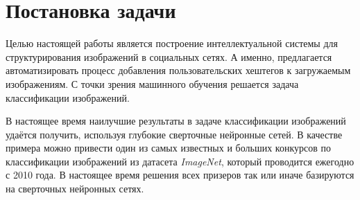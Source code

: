 \section{Постановка задачи}


\indent 
\indent
Целью настоящей работы является построение интеллектуальной системы для
структурирования изображений в социальных сетях. А именно, предлагается
автоматизировать процесс добавления пользовательских хештегов к загружаемым
изображениям. С точки зрения машинного обучения решается задача классификации изображений.

\indent
В настоящее время наилучшие результаты в задаче классификации изображений 
удаётся получить, используя глубокие сверточные нейронные сетей. В 
качестве примера можно привести один из самых известных и больших
конкурсов по классификации изображений из датасета \textit{ImageNet}\cite{imagenet},
который проводится ежегодно с 2010 года. В настоящее время решения всех призеров 
так или иначе базируются на сверточных нейронных сетях.

